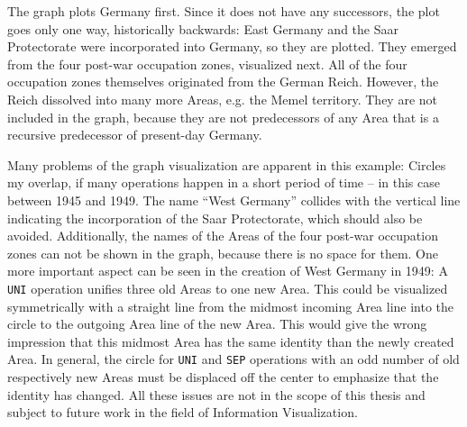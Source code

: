 The graph plots Germany first. Since it does not have any successors, the plot goes only one way, historically backwards: East Germany and the Saar Protectorate were incorporated into Germany, so they are plotted. They emerged from the four post-war occupation zones, visualized next. All of the four occupation zones themselves originated from the German Reich. However, the Reich dissolved into many more Areas, e.g. the Memel territory. They are not included in the graph, because they are not predecessors of any Area that is a recursive predecessor of present-day Germany.

Many problems of the graph visualization are apparent in this example: Circles my overlap, if many operations happen in a short period of time -- in this case between 1945 and 1949.
The name ``West Germany'' collides with the vertical line indicating the incorporation of the Saar Protectorate, which should also be avoided.
Additionally, the names of the Areas of the four post-war occupation zones can not be shown in the graph, because there is no space for them.
One more important aspect can be seen in the creation of West Germany in 1949: A \texttt{UNI} operation unifies three old Areas to one new Area. This could be visualized symmetrically with a straight line from the midmost incoming Area line into the circle to the outgoing Area line of the new Area. This would give the wrong impression that this midmost Area has the same identity than the newly created Area. In general, the circle for \texttt{UNI} and \texttt{SEP} operations with an odd number of old respectively new Areas must be displaced off the center to emphasize that the identity has changed.
All these issues are not in the scope of this thesis and subject to future work in the field of Information Visualization.


